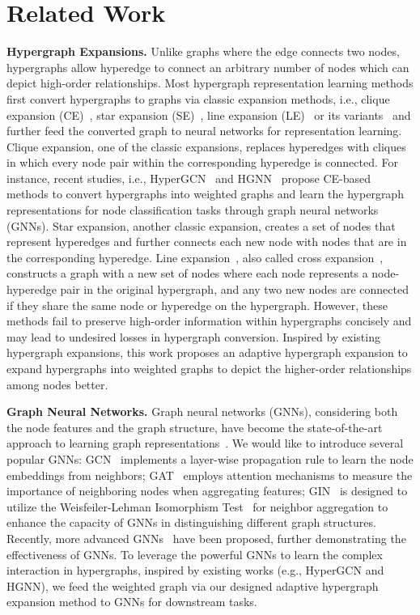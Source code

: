 \section{Related Work}
\noindent\textbf{Hypergraph Expansions.} Unlike graphs where the edge connects two nodes, hypergraphs allow hyperedge to connect an arbitrary number of nodes which can depict high-order relationships. 
Most hypergraph representation learning methods first convert hypergraphs to graphs via classic expansion methods, i.e., clique expansion (CE)~\cite{CE}, star expansion (SE)~\cite{CESE}, 
line expansion (LE)~\cite{LEGNN} 
or its variants~\cite{HyperGCN,HGNN,zhou2006learning} and further feed the converted graph to neural networks for representation learning.
Clique expansion, one of the classic expansions, replaces hyperedges with cliques in which every node pair within the corresponding hyperedge is connected.
For instance, recent studies, i.e., HyperGCN~\cite{HyperGCN} and HGNN~\cite{HGNN} propose CE-based methods to convert hypergraphs into weighted graphs and learn the hypergraph representations for node classification tasks through graph neural networks (GNNs). 
Star expansion, another classic expansion, creates a set of nodes that represent hyperedges and further connects each new node with nodes that are in the corresponding hyperedge. 
Line expansion~\cite{LEGNN}, also called cross expansion~\cite{yan2024hypergraph}, constructs a graph with a new set of nodes where each node represents a node-hyperedge pair in the original hypergraph, and any two new nodes are connected if they share the same node or hyperedge on the hypergraph.
However, these methods fail to preserve high-order information within hypergraphs concisely and may lead to undesired losses in hypergraph conversion.  
Inspired by existing hypergraph expansions, this work proposes an adaptive hypergraph expansion to expand hypergraphs into weighted graphs to depict the higher-order relationships among nodes better. 

\noindent\textbf{Graph Neural Networks.}
 Graph neural networks (GNNs), considering both the node features and the graph structure, have become the state-of-the-art approach to learning graph representations~\cite{wang2025neuralgraphpatternmachine,wang2024learning,wang2024can}. 
 We would like to introduce several popular GNNs: GCN~\cite{GCN} implements a layer-wise propagation rule to learn the node embeddings from neighbors;
GAT~\cite{GAT} employs attention mechanisms to measure the importance of neighboring nodes when aggregating features;
GIN~\cite{GIN} is designed to utilize the Weisfeiler-Lehman Isomorphism Test~\cite{WLTest} for neighbor aggregation to enhance the capacity of GNNs in distinguishing different graph structures. 
Recently, more advanced GNNs~\cite{zhang2019heterogeneous,zhang2024ngqa,zhang2024mopi,GraphSage,wang2024gft,wang2024training} have been proposed, further demonstrating the effectiveness of GNNs.
 To leverage the powerful GNNs to learn the complex interaction in hypergraphs, inspired by existing works (e.g., HyperGCN and HGNN), we feed the weighted graph via our designed adaptive hypergraph expansion method to GNNs for downstream tasks. 



